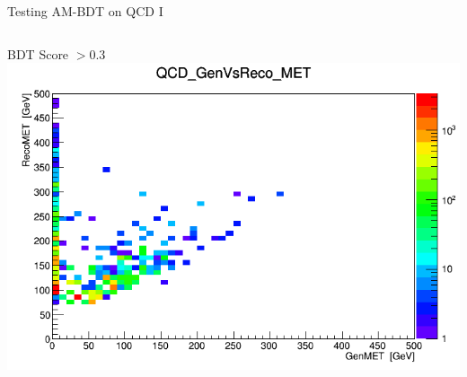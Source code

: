 \documentclass[8pt]{beamer}
\begin{document}
\begin{frame}{Testing AM-BDT on QCD I}
\begin{columns}
\begin{block}{BDT Score $> 0.3$}
\centering
\includegraphics[width=\linewidth]{img/BDT0p3_QCD_GenVsReco_MET.png} 
 
\end{block}

\end{columns}

\end{frame}
\end{document}
